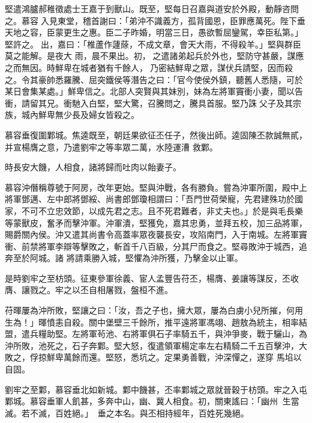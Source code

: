 \begin{pinyinscope}
 堅遣鴻臚郝稚徵處士王嘉于到獸山。既至，堅每日召嘉與道安於外殿，動靜咨問之。慕容入見東堂，稽首謝曰：「弟沖不識義方，孤背國恩，臣罪應萬死。陛下垂天地之容，臣蒙更生之惠。臣二子昨婚，明當三日，愚欲暫屈鑾駕，幸臣私第。」堅許之。出，嘉曰：「椎蘆作蘧蒢，不成文章，會天大雨，不得殺羊。」堅與群臣莫之能解。是夜大
 雨，晨不果出。初，之遣諸弟起兵於外也，堅防守甚嚴，謀應之而無因。時鮮卑在城者猶有千餘人，乃密結鮮卑之眾，謀伏兵請堅，因而殺之。令其豪帥悉羅騰、屈突鐵侯等潛告之曰：「官今使侯外鎮，聽舊人悉隨，可於某日會集某處。」鮮卑信之。北部人突賢與其妹別，妹為左將軍竇衝小妻，聞以告衝，請留其兄。衝馳入白堅，堅大驚，召騰問之，騰具首服。堅乃誅父子及其宗族，城內鮮卑無少長及婦女皆殺之。



 慕容垂復圍鄴城。焦逵既至，朝廷果欲征丕任子，然後出師。逵固陳丕款誠無貳，并宣楊膺之意，乃遣劉牢之等率眾二萬，水陸運漕
 救鄴。



 時長安大饑，人相食，諸將歸而吐肉以飴妻子。



 慕容沖僭稱尊號于阿房，改年更始。堅與沖戰，各有勝負。嘗為沖軍所圍，殿中上將軍鄧邁、左中郎將鄧綏、尚書郎鄧瓊相謂曰：「吾門世荷榮寵，先君建殊功於國家，不可不立忠效節，以成先君之志。且不死君難者，非丈夫也。」於是與毛長樂等蒙獸皮，奮矛而擊沖軍。沖軍潰，堅獲免，嘉其忠勇，並拜五校，加三品將軍，賜爵關內侯。沖又遣其尚書令高蓋率眾夜襲長安，攻陷南門，入于南城。左將軍竇衝、前禁將軍李辯等擊敗之，斬首千八百級，分其尸而食之。堅尋敗沖于城西，追奔至於阿城。諸
 將請乘勝入城，堅懼為沖所獲，乃擊金以止軍。



 是時劉牢之至枋頭。征東參軍徐義、宦人孟豐告苻丕，楊膺、姜讓等謀反，丕收膺、讓戮之。牢之以丕自相屠戮，盤桓不進。



 苻暉屢為沖所敗，堅讓之曰：「汝，吾之子也，擁大眾，屢為白虜小兒所摧，何用生為！」暉憤恚自殺。關中堡壁三千餘所，推平遠將軍馮翊、趙敖為統主，相率結盟，遣兵糧助堅。左將軍茍池、右將軍俱石子率騎五千，與沖爭麥，戰于驪山，為沖所敗，池死之，石子奔鄴。堅大怒，復遣領軍楊定率左右精騎二千五百擊沖，大敗之，俘掠鮮卑萬餘而還。堅怒，悉坑之。定果勇善戰，沖深憚之，遂穿
 馬埳以自固。



 劉牢之至鄴，慕容垂北如新城。鄴中饑甚，丕率鄴城之眾就晉穀于枋頭。牢之入屯鄴城。慕容垂軍人飢甚，多奔中山，幽、冀人相食。初，關東謠曰：「幽州，生當滅。若不滅，百姓絕。」，垂之本名。與丕相持經年，百姓死幾絕。




\end{pinyinscope}

